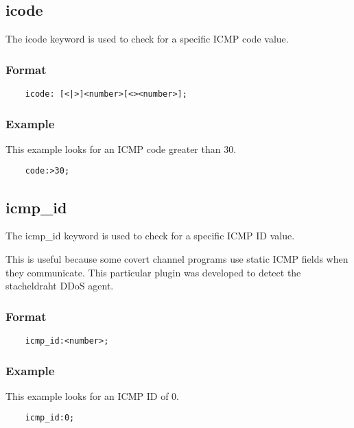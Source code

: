 \documentclass[english]{report}
\begin{document}
\subsection{icode}

The icode keyword is used to check for a specific ICMP code value.

\subsubsection{Format}

\begin{verbatim}
    icode: [<|>]<number>[<><number>];
\end{verbatim}

\subsubsection{Example}

This example looks for an ICMP code greater than 30.

\begin{verbatim}
    code:>30;
\end{verbatim}

\subsection{icmp\_id}

The icmp\_id keyword is used to check for a specific ICMP ID value.

This is useful because some covert channel programs use static ICMP fields when
they communicate.  This particular plugin was developed to detect the
stacheldraht DDoS agent.

\subsubsection{Format}

\begin{verbatim}
    icmp_id:<number>;
\end{verbatim}

\subsubsection{Example}

This example looks for an ICMP ID of 0.

\begin{verbatim}
    icmp_id:0;
\end{verbatim}
\end{document}
